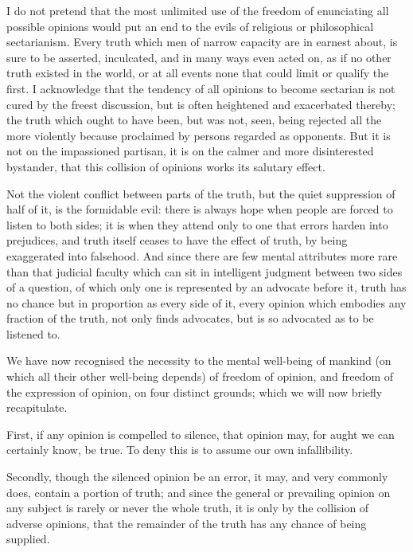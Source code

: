 I do not pretend that the most unlimited use of the freedom of enunciating all possible opinions would put an end to the evils of religious or philosophical sectarianism. Every truth which men of narrow capacity are in earnest about, is sure to be asserted, inculcated, and in many ways even acted on, as if no other truth existed in the world, or at all events none that could limit or qualify the first. I acknowledge that the tendency of all opinions to become sectarian is not cured by the freest discussion, but is often heightened and exacerbated thereby; the truth which ought to have been, but was not, seen, being rejected all the more violently because proclaimed by persons regarded as opponents. But it is not on the impassioned partisan, it is on the calmer and more disinterested bystander, that this collision of opinions works its salutary effect.\par

Not the violent conflict between parts of the truth, but the quiet suppression of half of it, is the formidable evil: there is always hope when people are forced to listen to both sides; it is when they attend only to one that errors harden into prejudices, and truth itself ceases to have the effect of truth, by being exaggerated into falsehood. And since there are few mental attributes more rare than that judicial faculty which can sit in intelligent judgment between two sides of a question, of which only one is represented by an advocate before it, truth has no chance but in proportion as every side of it, every opinion which embodies any fraction of the truth, not only finds advocates, but is so advocated as to be listened to.\par

We have now recognised the necessity to the mental well-being of mankind (on which all their other well-being depends) of freedom of opinion, and freedom of the expression of opinion, on four distinct grounds; which we will now briefly recapitulate.\par

First, if any opinion is compelled to silence, that opinion may, for aught we can certainly know, be true. To deny this is to assume our own infallibility.\par

Secondly, though the silenced opinion be an error, it may, and very commonly does, contain a portion of truth; and since the general or prevailing opinion on any subject is rarely or never the whole truth, it is only by the collision of adverse opinions, that the remainder of the truth has any chance of being supplied.\par

